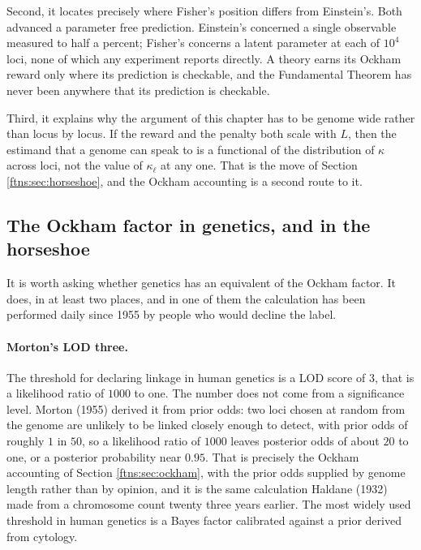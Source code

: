 Second, it locates precisely where Fisher's position differs from Einstein's. Both advanced a
parameter free prediction. Einstein's concerned a single observable measured to half a percent;
Fisher's concerns a latent parameter at each of $10^4$ loci, none of which any experiment reports
directly. A theory earns its Ockham reward only where its prediction is checkable, and the
Fundamental Theorem has never been anywhere that its prediction is checkable.

Third, it explains why the argument of this chapter has to be genome wide rather than
locus by locus. If the reward and the penalty both scale with $L$, then the estimand that a genome
can speak to is a functional of the distribution of $\kappa$ across loci, not the value of
$\kappa_\ell$ at any one. That is the move of Section \ref{ftns:sec:horseshoe}, and the Ockham
accounting is a second route to it.

\subsection{The Ockham factor in genetics, and in the horseshoe}
\label{ftns:sec:ockhamgen}

It is worth asking whether genetics has an equivalent of the Ockham factor. It does, in at least
two places, and in one of them the calculation has been performed daily since 1955 by people who
would decline the label.

\paragraph{Morton's LOD three.} The threshold for declaring linkage in human genetics is a LOD
score of $3$, that is a likelihood ratio of $1000$ to one. The number does not come from a
significance level. Morton (1955) derived it from prior odds: two loci chosen at random from the
genome are unlikely to be linked closely enough to detect, with prior odds of roughly $1$ in $50$,
so a likelihood ratio of $1000$ leaves posterior odds of about $20$ to one, or a posterior
probability near $0.95$. That is precisely the Ockham accounting of Section \ref{ftns:sec:ockham}, with
the prior odds supplied by genome length rather than by opinion, and it is the same calculation
Haldane (1932) made from a chromosome count twenty three years earlier. The most widely used
threshold in human genetics is a Bayes factor calibrated against a prior derived from cytology.

